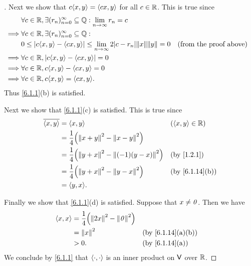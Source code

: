\begin{proof}[]
  Next we show that \(c \inn{x, y} = \inn{cx, y}\) for all \(c \in \mathbb{R}\).
  This is true since
  \begin{align*}
             & \forall c \in \R, \exists (r_n)_{n = 0}^\infty \subseteq \Q : \lim_{n \to \infty} r_n = c                                                 \\
    \implies & \forall c \in \R, \exists (r_n)_{n = 0}^\infty \subseteq \Q :                                                                             \\
             & 0 \leq \abs{c \inn{x, y} - \inn{cx, y}} \leq \lim_{n \to \infty} 2 \abs{c - r_n} \norm{x} \norm{y} = 0 &  & \text{(from the proof above)} \\
    \implies & \forall c \in \R, \abs{c \inn{x, y} - \inn{cx, y}} = 0                                                                                    \\
    \implies & \forall c \in \R, c \inn{x, y} - \inn{cx, y} = 0                                                                                          \\
    \implies & \forall c \in \R, c \inn{x, y} = \inn{cx, y}.
  \end{align*}
  Thus \cref{6.1.1}(b) is satisfied.

  Next we show that \cref{6.1.1}(c) is satisfied.
  This is true since
  \begin{align*}
    \conj{\inn{x, y}} & = \inn{x, y}                                              &  & (\inn{x, y} \in \R) \\
                      & = \frac{1}{4} \pa{\norm{x + y}^2 - \norm{x - y}^2}                                 \\
                      & = \frac{1}{4} \pa{\norm{y + x}^2 - \norm{(-1) (y - x)}^2} &  & \by{1.2.1}          \\
                      & = \frac{1}{4} \pa{\norm{y + x}^2 - \norm{y - x}^2}        &  & \by{6.1.14}[b]      \\
                      & = \inn{y, x}.
  \end{align*}

  Finally we show that \cref{6.1.1}(d) is satisfied.
  Suppose that \(x \neq \mathit{0}\).
  Then we have
  \begin{align*}
    \inn{x, x} & = \frac{1}{4} \pa{\norm{2x}^2 - \norm{\zv}^2}                       \\
               & = \norm{x}^2                                  &  & \by{6.1.14}[a,b] \\
               & > 0.                                          &  & \by{6.1.14}[a]
  \end{align*}
  We conclude by \cref{6.1.1} that \(\left\langle\cdot, \cdot\right\rangle\) is an inner product on \(\mathsf{V}\) over \(\mathbb{R}\).
\end{proof}

